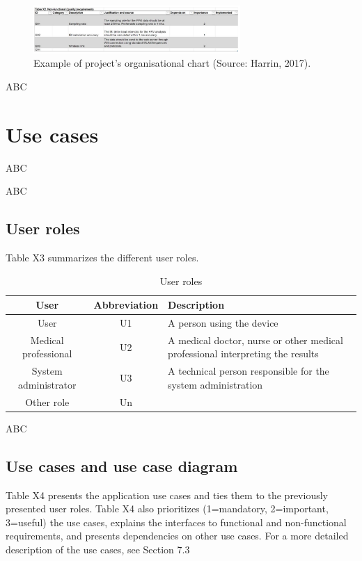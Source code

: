 \documentclass{article}
\begin{document}
\begin{figure}[h]
  \centering
  \includegraphics[width=0.7\textwidth]{screenshot2.png}
  \caption{ Example of project's organisational chart (Source: Harrin, 2017).}
  \label{harrin}
\end{figure}


ABC


\section{Use cases}

ABC



ABC


\subsection{User roles}
Table X3 summarizes the different user roles.


\begin{table}[h]
\centering
\begin{tabular}{|c|c|p{4cm}|}
\hline
\textbf{User} & \textbf{Abbreviation} & \textbf{Description} \\
\hline
User & U1 & A person using the device \\
\hline
Medical professional & U2 & A medical doctor, nurse or other medical professional interpreting the results \\ \hline
System administrator & U3 & A technical person responsible for the system administration \\ \hline
Other role & Un & \\
\hline
\end{tabular}
\caption{User roles}
\label{tab:X3}
\end{table}

ABC

\subsection{Use cases and use case diagram}
Table X4 presents the application use cases and ties them to the previously presented user
roles. Table X4 also prioritizes (1=mandatory, 2=important, 3=useful) the use cases,
explains the interfaces to functional and non-functional requirements, and presents
dependencies on other use cases. For a more detailed description of the use cases, see
Section 7.3
\end{document}
